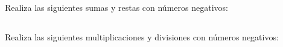 \documentclass[12pt,addpoints]{evalua}
\begin{document}
\begin{questions}
      \begin{multicols}{2}
      \end{multicols}

      \subsection*{\else{}\fi}
      \question[4] Realiza las siguientes sumas y restas con números negativos:

      \begin{multicols}{2}
      \end{multicols}

      \subsection*{\else{}\fi}
      \question[4] Realiza las siguientes multiplicaciones y divisiones con números negativos:
      \begin{multicols}{2}
      \end{multicols}


\end{questions}
\end{document}
